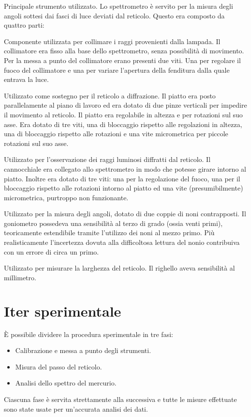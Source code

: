 \documentclass[a4paper,10pt]{article}
\begin{document}
\begin{description}[align=left]
		\item [Spettrometro] Principale strumento utilizzato. Lo spettrometro è servito per la misura degli angoli sottesi dai fasci di luce deviati dal reticolo. Questo era composto da quattro parti:
		\begin{description} [align=left]
			\item [Collimatore] Componente utilizzata per collimare i raggi provenienti dalla lampada. Il collimatore era fisso alla base dello spettrometro, senza possibilità di movimento. Per la messa a punto del collimatore erano presenti due viti. Una per regolare il fuoco del collimatore e una per variare l'apertura della fenditura dalla quale entrava la luce.
			\item [Piatto] Utilizzato come sostegno per il reticolo a diffrazione. Il piatto era posto parallelamente al piano di lavoro ed era dotato di due pinze verticali per impedire il movimento al reticolo. Il piatto era regolabile in altezza e per rotazioni sul suo asse. Era dotato di tre viti, una di bloccaggio rispetto alle regolazioni in altezza, una di bloccaggio rispetto alle rotazioni e una vite micrometrica per piccole rotazioni sul suo asse.
			\item[Cannocchiale] Utilizzato per l'osservazione dei raggi luminosi diffratti dal reticolo. Il cannocchiale era collegato allo spettrometro in modo che potesse girare intorno al piatto. Inoltre era dotato di tre viti: una per la regolazione del fuoco, una per il bloccaggio rispetto alle rotazioni intorno al piatto ed una vite (presumibilmente) micrometrica, purtroppo non funzionante.
			\item[Goniometro] Utilizzato per la misura degli angoli, dotato di due coppie di noni contrapposti. Il goniometro possedeva una sensibilità al terzo di grado (ossia venti primi), teoricamente estendibile tramite l'utilizzo dei noni al mezzo primo. Più realisticamente l'incertezza dovuta alla difficoltosa lettura del nonio contribuiva con un errore di circa un primo.
		\end{description}
		
		\item[Righello] Utilizzato per misurare la larghezza del reticolo. Il righello aveva sensibilità al millimetro.
	\end{description}
	\section{Iter sperimentale}
	È possibile dividere la procedura sperimentale in tre fasi:
	\begin{itemize}
		\item Calibrazione e messa a punto degli strumenti.
		\item Misura del passo del reticolo.
		\item Analisi dello spettro del mercurio.
	\end{itemize}
	Ciascuna fase è servita strettamente alla successiva e tutte le misure effettuate sono state usate per un'accurata analisi dei dati.
\end{document}
